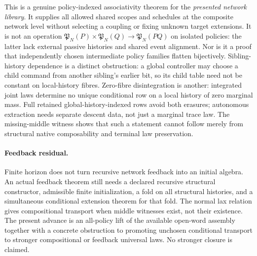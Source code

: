 \documentclass[11pt]{article}
\begin{document}
This is a genuine policy-indexed associativity theorem for the \emph{presented network library}. It supplies all allowed shared scopes and schedules at the composite network level without selecting a coupling or fixing unknown target extensions. It is not an operation $\mathfrak P_N(P)\times\mathfrak P_N(Q)\to\mathfrak P_N(PQ)$ on isolated policies: the latter lack external passive histories and shared event alignment. Nor is it a proof that independently chosen intermediate policy families flatten bijectively. Sibling-history dependence is a distinct obstruction: a global controller may choose a child command from another sibling's earlier bit, so its child table need not be constant on local-history fibres. Zero-fibre disintegration is another: integrated joint laws determine no unique conditional row on a local history of zero marginal mass. Full retained global-history-indexed rows avoid both erasures; autonomous extraction needs separate descent data, not just a marginal trace law. The missing-middle witness shows that such a statement cannot follow merely from structural native composability and terminal law preservation.

\paragraph{Feedback residual.}
Finite horizon does not turn recursive network feedback into an initial algebra. An actual feedback theorem still needs a declared recursive structural constructor, admissible finite initialization, a fold on all structural histories, and a simultaneous conditional extension theorem for that fold. The normal lax relation gives compositional transport when middle witnesses exist, not their existence. The present advance is an all-policy lift of the available open-word assembly together with a concrete obstruction to promoting unchosen conditional transport to stronger compositional or feedback universal laws. No stronger closure is claimed.
\end{document}
